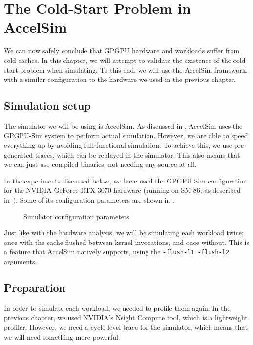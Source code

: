 \chapter{The Cold-Start Problem in AccelSim}\label{ch:sim-analysis}

We can now safely conclude that GPGPU hardware and workloads suffer from cold caches.
In this chapter, we will attempt to validate the existence of the cold-start problem when simulating.
To this end, we will use the AccelSim framework, with a similar configuration to the hardware we used in the previous chapter.

\section{Simulation setup}\label{sec:simulation-setup}
The simulator we will be using is AccelSim\cite{accelsim}.
As discussed in , AccelSim uses the GPGPU-Sim\cite{gpgpu-sim} system to perform actual simulation.
However, we are able to speed everything up by avoiding full-functional simulation.
To achieve this, we use pre-generated traces, which can be replayed in the simulator.
This also means that we can just use compiled binaries, not needing any source at all.

In the experiments discussed below, we have used the GPGPU-Sim configuration for the NVIDIA GeForce RTX 3070 hardware (running on SM 86; as described in\ \cite{nvidia-wp}).
Some of its configuration parameters are shown in .

\begin{figure}[ht]
    \centering
    
    \caption{Simulator configuration parameters}
    \label{fig:sim_config}
\end{figure}

Just like with the hardware analysis, we will be simulating each workload twice: once with the cache flushed between kernel invocations, and once without.
This is a feature that AccelSim natively supports, using the \verb|-flush-l1 -flush-l2| arguments.

\FloatBarrier
\section{Preparation}\label{sec:preparation}
In order to simulate each workload, we needed to profile them again.
In the previous chapter, we used NVIDIA's Nsight Compute tool, which is a lightweight profiler.
However, we need a cycle-level trace for the simulator, which means that we will need something more powerful.

